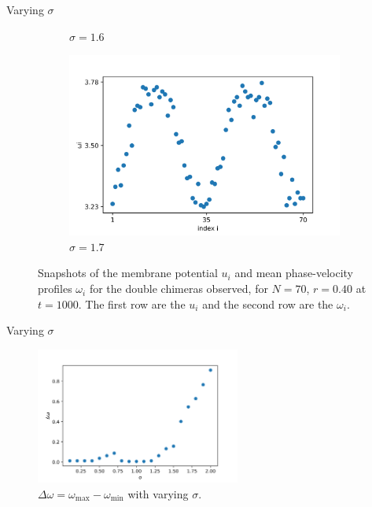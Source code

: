 \documentclass{beamer}
\begin{document}
\begin{frame}{Varying $\sigma$}
\begin{figure}[H]
\begin{subfigure}{.32\textwidth}
  \caption{$\sigma = 1.6$}
\end{subfigure}
\hfill
\begin{subfigure}{.32\textwidth}
  \centering
  \includegraphics[width=1\linewidth]{w_sigma=1.7.png}  
  \caption{$\sigma = 1.7$}
\end{subfigure}
\caption{Snapshots of the membrane potential $u_i$ and mean phase-velocity profiles $\omega_i$ for the double chimeras observed, for $N=70$, $r=0.40$ at $t=1000$. The first row are the $u_i$ and the second row are the $\omega_i$.}
\label{dchim}
\end{figure}

\end{frame}

\begin{frame}{Varying $\sigma$}

\begin{figure}[H]
\centering
\includegraphics[width=0.6\textwidth]{deltaw.png}
\caption{$\Delta \omega = \omega_{\text{max}}-\omega_{\text{min}}$ with varying $\sigma$.}
\label{dchim2}
\end{figure}
\end{frame}
\end{document}
